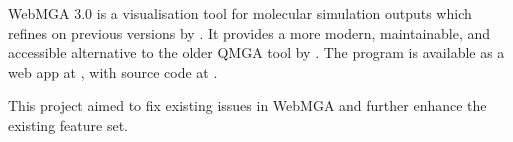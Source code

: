 WebMGA 3.0 is a visualisation tool for molecular simulation outputs which refines on previous versions by \textcite{Battistini_2021,webmga_2}. It provides a more modern, maintainable, and accessible alternative to the older QMGA tool by \textcite{gabriel2008molecular}. The program is available as a web app at , with source code at .

This project aimed to fix existing issues in WebMGA and further enhance the existing feature set.
